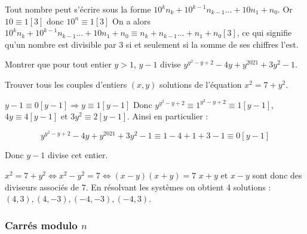 \bigskip

\begin{ex}
Tout nombre peut s'écrire sous la forme $10^kn_k+10^{k-1}n_{k-1}...+10n_1+n_0$.
\newline
Or $10\equiv 1[3]$ donc $10^n\equiv 1[3]$
\newline
On a alors $10^kn_k+10^{k-1}n_{k-1}...+10n_1+n_0\equiv n_k+n_{k-1}...+n_1+n_0[3]$, ce qui signifie qu'un nombre est divisible par 3 si et seulement si la somme de ses chiffres l'est.
\end{ex}


\begin{exo}
Montrer que pour tout entier $y>1$, $y-1$ divise $y^{y^2-y+2}-4y+y^{2021}+3y^2-1$.
\end{exo}


\begin{exo}
Trouver tous les couples d'entiers $(x,y)$ solutions de l'équation $x^2=7+y^2$.
\end{exo}




\vspace{0.5cm}
\begin{sol}
$y-1\equiv 0[y-1] \Rightarrow y\equiv 1 [y-1]$
\newline Donc $y^{y^2-y+2}\equiv 1^{y^2-y+2}\equiv 1[y-1]$, $4y\equiv 4[y-1]$ et $3y^2\equiv 2 [y-1]$.
\newline Ainsi en particulier :

$$y^{y^2-y+2}-4y+y^{2021}+3y^2-1\equiv 1-4+1+3-1\equiv 0[y-1]$$

Donc $y-1$ divise cet entier.
\end{sol}

\begin{sol}
$x^2=7+y^2 \iff x^2-y^2=7 \iff (x-y)(x+y)=7$
\newline $x+y$ et $x-y$ sont donc des diviseurs associés de 7.
\newline En résolvant les systèmes on obtient 4 solutions : $(4,3), (4,-3), (-4,-3), (-4,3)$.
\end{sol}

\bigskip


\subsubsection{Carrés modulo $n$}


